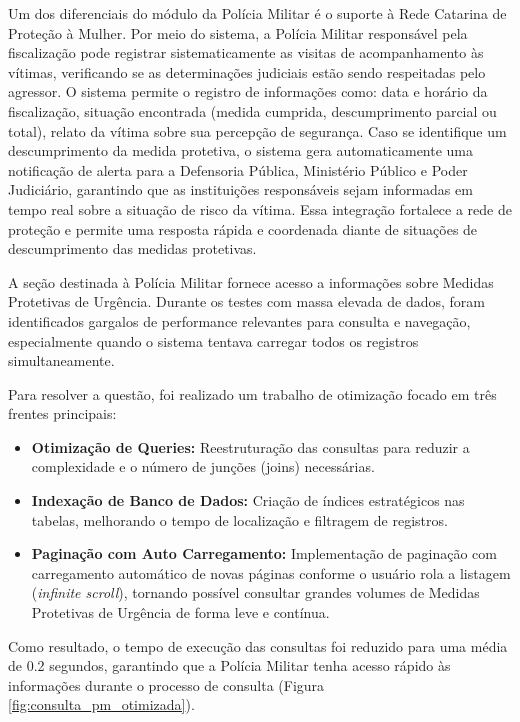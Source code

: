 \par Um dos diferenciais do módulo da Polícia Militar é o suporte à Rede Catarina de Proteção à Mulher. Por meio do sistema, a Polícia Militar responsável pela fiscalização pode registrar sistematicamente as visitas de acompanhamento às vítimas, verificando se as determinações judiciais estão sendo respeitadas pelo agressor. O sistema permite o registro de informações como: data e horário da fiscalização, situação encontrada (medida cumprida, descumprimento parcial ou total), relato da vítima sobre sua percepção de segurança. Caso se identifique um descumprimento da medida protetiva, o sistema gera automaticamente uma notificação de alerta para a Defensoria Pública, Ministério Público e Poder Judiciário, garantindo que as instituições responsáveis sejam informadas em tempo real sobre a situação de risco da vítima. Essa integração fortalece a rede de proteção e permite uma resposta rápida e coordenada diante de situações de descumprimento das medidas protetivas.

\par A seção destinada à Polícia Militar fornece acesso a informações sobre Medidas Protetivas de Urgência. Durante os testes com massa elevada de dados, foram identificados gargalos de performance relevantes para consulta e navegação, especialmente quando o sistema tentava carregar todos os registros simultaneamente.

\par Para resolver a questão, foi realizado um trabalho de otimização focado em três frentes principais:

\begin{itemize}
    \item \textbf{Otimização de Queries:} Reestruturação das consultas para reduzir a complexidade e o número de junções (joins) necessárias.
    \item \textbf{Indexação de Banco de Dados:} Criação de índices estratégicos nas tabelas, melhorando o tempo de localização e filtragem de registros.
    \item \textbf{Paginação com Auto Carregamento:} Implementação de paginação com carregamento automático de novas páginas conforme o usuário rola a listagem (\textit{infinite scroll}), tornando possível consultar grandes volumes de Medidas Protetivas de Urgência de forma leve e contínua.
\end{itemize}

\par Como resultado, o tempo de execução das consultas foi reduzido para uma média de 0.2 segundos, garantindo que a Polícia Militar tenha acesso rápido às informações durante o processo de consulta (Figura \ref{fig:consulta_pm_otimizada}).

